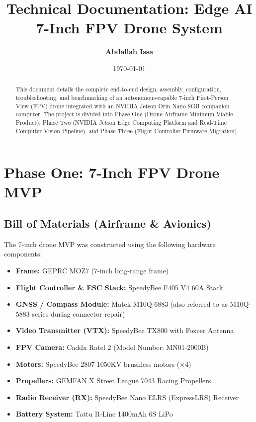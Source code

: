 \documentclass[11pt,a4paper]{article}
\title{\textbf{Technical Documentation: Edge AI 7-Inch FPV Drone System}}
\author{\textbf{Abdallah Issa}}
\date{\today}
\begin{document}
\maketitle

\begin{abstract}
This document details the complete end-to-end design, assembly, configuration, troubleshooting, and benchmarking of an autonomous-capable 7-inch First-Person View (FPV) drone integrated with an NVIDIA Jetson Orin Nano 8GB companion computer. The project is divided into Phase One (Drone Airframe Minimum Viable Product), Phase Two (NVIDIA Jetson Edge Computing Platform and Real-Time Computer Vision Pipeline), and Phase Three (Flight Controller Firmware Migration).
\end{abstract}

\tableofcontents
\newpage

\section{Phase One: 7-Inch FPV Drone MVP} 

\subsection{Bill of Materials (Airframe \& Avionics)} 
The 7-inch drone MVP was constructed using the following hardware components: 
\begin{itemize}
    \item \textbf{Frame:} GEPRC MOZ7 (7-inch long-range frame) 
    \item \textbf{Flight Controller \& ESC Stack:} SpeedyBee F405 V4 60A Stack 
    \item \textbf{GNSS / Compass Module:} Matek M10Q-6883 (also referred to as M10Q-5883 series during connector repair) 
    \item \textbf{Video Transmitter (VTX):} SpeedyBee TX800 with Foxeer Antenna 
    \item \textbf{FPV Camera:} Caddx Ratel 2 (Model Number: MN01-2000B) 
    \item \textbf{Motors:} SpeedyBee 2807 1050KV brushless motors ($\times 4$) 
    \item \textbf{Propellers:} GEMFAN X Street League 7043 Racing Propellers 
    \item \textbf{Radio Receiver (RX):} SpeedyBee Nano ELRS (ExpressLRS) Receiver 
    \item \textbf{Battery System:} Tattu R-Line 1400mAh 6S LiPo 
\end{itemize}
\end{document}
